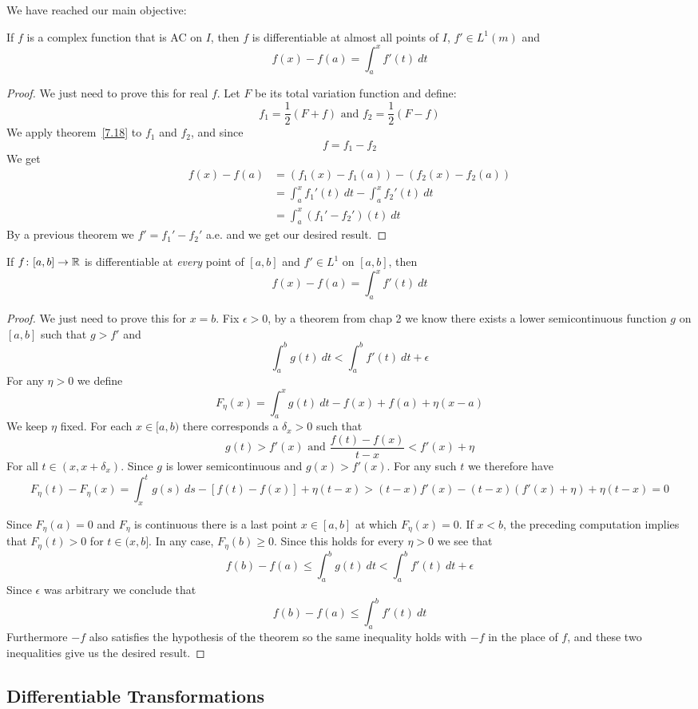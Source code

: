     We have reached our main objective:
    \begin{theorem}
        If $f$ is a complex function that is AC on $I$, then $f$ is differentiable at almost all points of $I$, $f'\in L^1(m)$ and \[
            f(x)-f(a) = \int_a^x f'(t)~dt     
        \]
        \begin{proof}
            We just need to prove this for real $f$. Let $F$ be its total variation function and define:\[
                f_1 = \frac{1}{2}(F+f) \text{ and }f_2 = \frac{1}{2}(F-f)    
            \]
            We apply theorem~\ref*{7.18} to $f_1$ and $f_2$, and since \[
                f=f_1-f_2    
            \]
            We get \begin{align*}
                f(x)-f(a) &= (f_1(x)-f_1(a)) - (f_2(x)-f_2(a))\\
                &= \int_a^x f_1'(t)~dt -\int_a^x f_2'(t)~dt\\
                &= \int_a^x (f_1'-f_2')(t)~dt  
            \end{align*}
            By a previous theorem we $f' = f_1'-f_2'$ a.e. and we get our desired result.
        \end{proof}
    \end{theorem}

    \begin{theorem}
        If $f\colon [a,b]\rightarrow \mathbb{R}$ is differentiable at \textit{every} point of $[a,b]$ and $f'\in L^1$ on $[a,b]$, then \[
            f(x)-f(a) = \int_a^x f'(t)~dt    
        \]
        \begin{proof}
            We just need to prove this for $x=b$. Fix $\epsilon>0$, by a theorem from chap 2 we know there exists a lower semicontinuous function $g$ on $[a,b]$ such that $g>f'$ and \[
                \int_a^b g(t)~dt<\int_a^b f'(t)~dt+\epsilon    
            \]
            For any $\eta>0$ we define \[
                F_\eta(x) = \int_a^x g(t)~dt - f(x)+f(a)+\eta(x-a)    
            \]
            We keep $\eta$ fixed. For each $x\in [a,b)$ there corresponds a $\delta_x>0$ such that\[
                g(t)>f'(x) \text{ and }\frac{f(t)-f(x)}{t-x}<f'(x)+\eta    
            \]
            For all $t\in (x,x+\delta_x)$. Since $g$ is lower semicontinuous and $g(x)>f'(x)$. For any such $t$ we therefore have\[
                F_\eta(t) - F_\eta(x) = \int_x^t g(s)~ds - [f(t)-f(x)]+\eta(t-x) > (t-x)f'(x)-(t-x)(f'(x)+\eta)+\eta(t-x) = 0    
            \]

            Since $F_\eta(a) = 0$ and $F_\eta$ is continuous there is a last point $x\in [a,b]$ at which $F_\eta(x) = 0$. If $x<b$, the preceding computation implies that $F_\eta(t)>0$ for $t\in (x,b]$. In any case, $F_\eta(b)\geq 0$. Since this holds for every $\eta>0$ we see that \[
                f(b)-f(a)\leq \int_a^b g(t)~dt< \int_a^b f'(t)~dt + \epsilon    
            \] 
            Since $\epsilon$ was arbitrary we conclude that \[f(b)-f(a)\leq \int_a^b f'(t)~dt\] Furthermore $-f$ also satisfies the hypothesis of the theorem so the same inequality holds with $-f$ in the place of $f$, and these two inequalities give us the desired result.
        \end{proof}
    \end{theorem}
    \subsection{Differentiable Transformations}

    \printindex

